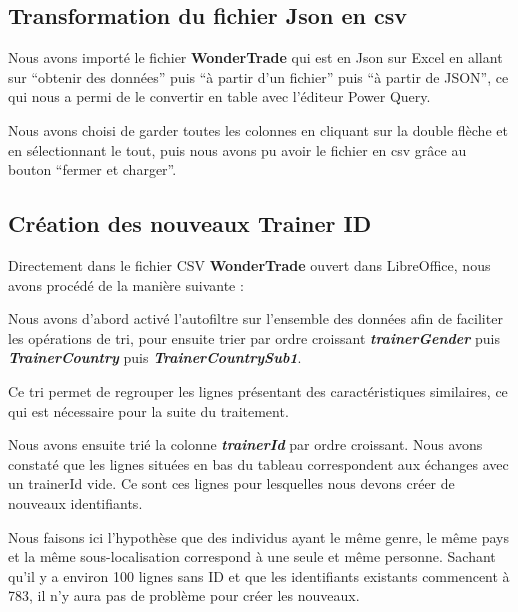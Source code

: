 \documentclass[mstat,12pt]{unswthesis}
\begin{document}
\subsection{Transformation du fichier Json en
csv}\label{transformation-du-fichier-json-en-csv}

Nous avons importé le fichier \textbf{WonderTrade} qui est en Json sur
Excel en allant sur ``obtenir des données'' puis ``à partir d'un
fichier'' puis ``à partir de JSON'', ce qui nous a permi de le convertir
en table avec l'éditeur Power Query.

\bigskip

Nous avons choisi de garder toutes les colonnes en cliquant sur la
double flèche et en sélectionnant le tout, puis nous avons pu avoir le
fichier en csv grâce au bouton ``fermer et charger''.

\bigskip

\subsection{Création des nouveaux Trainer
ID}\label{cruxe9ation-des-nouveaux-trainer-id}

Directement dans le fichier CSV \textbf{WonderTrade} ouvert dans
LibreOffice, nous avons procédé de la manière suivante :

\bigskip

Nous avons d'abord activé l'autofiltre sur l'ensemble des données afin
de faciliter les opérations de tri, pour ensuite trier par ordre
croissant \textbf{\emph{trainerGender}} puis
\textbf{\emph{TrainerCountry}} puis \textbf{\emph{TrainerCountrySub1}}.

\bigskip

Ce tri permet de regrouper les lignes présentant des caractéristiques
similaires, ce qui est nécessaire pour la suite du traitement.

\bigskip

Nous avons ensuite trié la colonne \textbf{\emph{trainerId}} par ordre
croissant. Nous avons constaté que les lignes situées en bas du tableau
correspondent aux échanges avec un trainerId vide. Ce sont ces lignes
pour lesquelles nous devons créer de nouveaux identifiants.

\bigskip

Nous faisons ici l'hypothèse que des individus ayant le même genre, le
même pays et la même sous-localisation correspond à une seule et même
personne. Sachant qu'il y a environ 100 lignes sans ID et que les
identifiants existants commencent à 783, il n'y aura pas de problème
pour créer les nouveaux.
\end{document}
